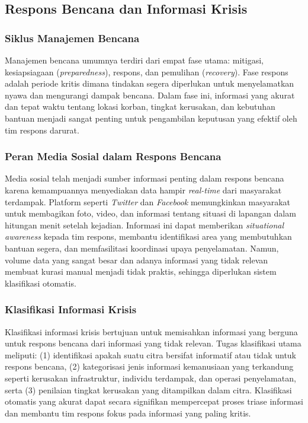 \subsection{Respons Bencana dan Informasi Krisis}
\label{II.Teori.Bencana}

\subsubsection{Siklus Manajemen Bencana}
Manajemen bencana umumnya terdiri dari empat fase utama: mitigasi,
kesiapsiagaan (\textit{preparedness}), respons, dan pemulihan
(\textit{recovery}). Fase respons adalah periode kritis dimana tindakan
segera diperlukan untuk menyelamatkan nyawa dan mengurangi dampak
bencana. Dalam fase ini, informasi yang akurat dan tepat waktu tentang
lokasi korban, tingkat kerusakan, dan kebutuhan bantuan menjadi sangat
penting untuk pengambilan keputusan yang efektif oleh tim respons
darurat. \par

\subsubsection{Peran Media Sosial dalam Respons Bencana}
Media sosial telah menjadi sumber informasi penting dalam respons
bencana karena kemampuannya menyediakan data hampir \textit{real-time}
dari masyarakat terdampak. Platform seperti \textit{Twitter} dan
\textit{Facebook} memungkinkan masyarakat untuk membagikan foto, video,
dan informasi tentang situasi di lapangan dalam hitungan menit setelah
kejadian. Informasi ini dapat memberikan \textit{situational awareness}
kepada tim respons, membantu identifikasi area yang membutuhkan bantuan
segera, dan memfasilitasi koordinasi upaya penyelamatan. Namun, volume
data yang sangat besar dan adanya informasi yang tidak relevan membuat
kurasi manual menjadi tidak praktis, sehingga diperlukan sistem
klasifikasi otomatis. \par

\subsubsection{Klasifikasi Informasi Krisis}
Klasifikasi informasi krisis bertujuan untuk memisahkan informasi yang
berguna untuk respons bencana dari informasi yang tidak relevan. Tugas
klasifikasi utama meliputi: (1) identifikasi apakah suatu citra bersifat
informatif atau tidak untuk respons bencana, (2) kategorisasi jenis
informasi kemanusiaan yang terkandung seperti kerusakan infrastruktur,
individu terdampak, dan operasi penyelamatan, serta (3) penilaian
tingkat kerusakan yang ditampilkan dalam citra. Klasifikasi otomatis
yang akurat dapat secara signifikan mempercepat proses triase informasi
dan membantu tim respons fokus pada informasi yang paling kritis. \par


